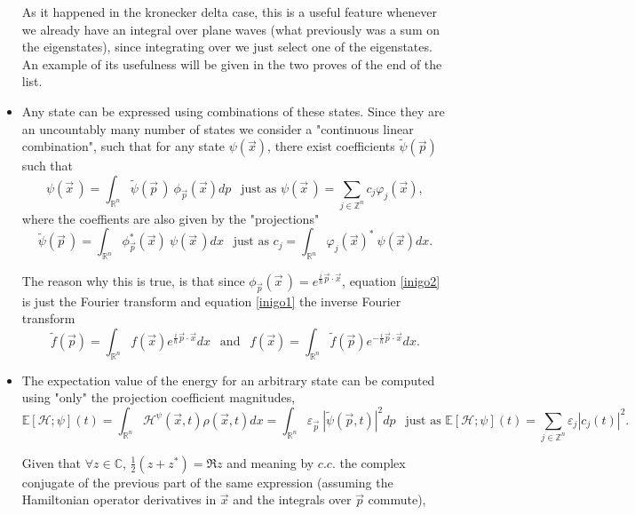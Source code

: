 \documentclass[11pt, a4paper]{article} %
\newcommand{\R}{\mathbb{R}} %
\newcommand{\Z}{\mathbb{Z}} %
\newcommand{\C}{\mathbb{C}}
\newcommand{\h}{\mathcal{H}}
\newcommand{\E}{\mathbb{E}}
\DeclareRobustCommand{\mybox}[2][gray!10]{%
\begin{tcolorbox}[   %
        left=0.2cm,
        right=0.2cm,
        top=0.15cm,
        bottom=0.15cm,
        colback=#1,
        colframe=#1,
        width=\dimexpr\textwidth\relax, 
        enlarge left by=0mm,
        boxsep=5pt,
        arc=0pt,outer arc=0pt,
        ]
        #2
\end{tcolorbox}
}
\begin{document}
\begin{itemize}
{As it happened in the kronecker delta case, this is a useful feature whenever we already have an integral over plane waves (what previously was a sum on the eigenstates), since integrating over we just select one of the eigenstates. An example of its usefulness will be given in the two proves of the end of the list. 

}
\item Any state can be expressed using combinations of these states. Since they are an uncountably many number of states we consider a "continuous linear combination", such that for any state $\psi(\vec{x})$, there exist coefficients $\tilde{\psi}(\vec{p})$ such that
\begin{equation}\label{inigo1}
\psi(\vec{x}\,)=\int_{\R^n}\tilde{\psi}(\vec{p}\,)\ \phi_{\vec{p}}(\vec{x})dp \ \ \text{ just as } \psi(\vec{x}\,)=\sum_{j\in\Z^n}c_j\varphi_{j}(\vec{x}),
\end{equation}
where the coeffients are also given by the "projections"
\begin{equation}\label{inigo2}
\tilde{\psi}(\vec{p}\,)=\int_{\R^n}\phi_{\vec{p}}^*(\vec{x})\ \psi(\vec{x}\,)dx\ \ \text{ just as } c_j=\int_{\R^n}\varphi_{j}(\vec{x})^*\ \psi(\vec{x})dx.
\end{equation}
\mybox{
The reason why this is true, is that since $\phi_{\vec{p}}(\vec{x}\,)=e^{\frac{i}{\hbar}\vec{p}\cdot\vec{x}}$, equation \eqref{inigo2} is just the Fourier transform and equation \eqref{inigo1} the inverse Fourier transform
\begin{equation}
\tilde{f}(\vec{p})=\int_{\R^n} f(\vec{x})e^{\frac{i}{\hbar}\vec{p}\cdot\vec{x}} dx \ \ \text{ and }\ \ f(\vec{x})=\int_{\R^n} \tilde{f}(\vec{p})e^{-\frac{i}{\hbar}\vec{p}\cdot\vec{x}} dx.
\end{equation}}
\item The expectation value of the energy for an arbitrary state can be computed using "only" the projection coefficient magnitudes,
\begin{equation}
\E[\h;\psi](t)=\int_{\R^n} \h^\psi(\vec{x},t)\rho(\vec{x},t)dx=\int_{\R^n}\varepsilon_{\vec{p}}\ |\tilde{\psi}(\vec{p},t)|^2dp \ \ \text{ just as }\E[\h;\psi](t)=\sum_{j\in\Z^n}\varepsilon_{j}|c_j(t)|^2.
\end{equation}
\mybox{
Given that $\forall z\in\C$, $\frac{1}{2}(z+z^*)=\Re{z}$ and meaning by $c.c.$ the complex conjugate of the previous part of the same expression (assuming the Hamiltonian operator derivatives in $\vec{x}$ and the integrals over $\vec{p}$ commute),
\begin{equation}

\end{equation}}
\end{itemize}
\end{document}
